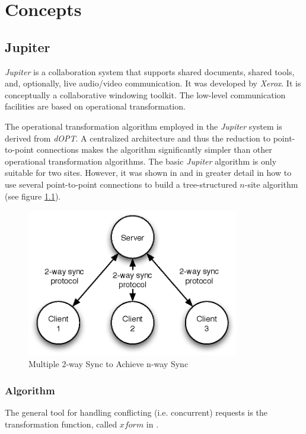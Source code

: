 \chapter{Concepts}
\section{Jupiter}
\emph{Jupiter} is a collaboration system that supports shared documents, shared tools, and, optionally, live audio/video communication. It was developed by \emph{Xerox}. It is conceptually a collaborative windowing toolkit. The low-level communication facilities are based on operational transformation.

The operational transformation algorithm employed in the \emph{Jupiter} system is derived from \emph{dOPT}. A centralized architecture and thus the reduction to point-to-point connections makes the algorithm significantly simpler than other operational transformation algorithms. The basic \emph{Jupiter} algorithm is only suitable for two sites. However, it was shown in \cite{jupiter95} and in greater detail in \cite{netedit:thesis} how to use several point-to-point connections to build a tree-structured $n$-site algorithm (see figure \ref{fig:concepts.nway}).

\begin{figure}[htb]
 \centering
 \includegraphics[width=9.3cm,height=6.5cm]{../../images/concepts_nway.eps}
 \caption{Multiple 2-way Sync to Achieve n-way Sync}
 \label{fig:concepts.nway}
\end{figure}

\subsection{Algorithm}
The general tool for handling conflicting (i.e. concurrent) requests is the transformation function, called $xform$ in \cite{jupiter95}.

